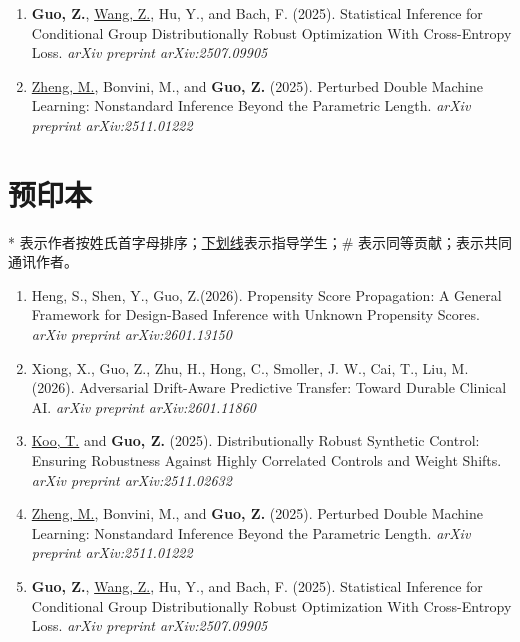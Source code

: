 \documentclass[margin, line]{res}
\begin{document}
\begin{resume}
\begin{enumerate}
			\item[(R8)] {\bf Guo, Z.}, \underline{Wang, Z.}, Hu, Y., and Bach, F. (2025).
				Statistical Inference for Conditional Group Distributionally Robust
				Optimization With Cross-Entropy Loss. {\it arXiv preprint arXiv:2507.09905}

			\item[(R9)] \underline{Zheng, M.}, Bonvini, M.\Envelope, and {\bf Guo, Z.}\Envelope
				(2025). Perturbed Double Machine Learning: Nonstandard Inference Beyond
				the Parametric Length. {\it arXiv preprint arXiv:2511.01222}
		\end{enumerate}

		\section{\sc 预印本}
		
		* 表示作者按姓氏首字母排序；\underline{下划线}表示指导学生；$\#$ 表示同等贡献；\Envelope 表示共同通讯作者。
		\vspace*{2mm}
		\begin{enumerate}
			\setlength{\itemsep}{3pt}

			\item Heng, S.\Envelope, Shen, Y., Guo, Z.\Envelope (2026). Propensity
				Score Propagation: A General Framework for Design-Based Inference with Unknown
				Propensity Scores. {\it arXiv preprint arXiv:2601.13150}

			\item Xiong, X., Guo, Z., Zhu, H., Hong, C., Smoller, J. W., Cai, T., Liu,
				M. (2026). Adversarial Drift-Aware Predictive Transfer: Toward Durable
				Clinical AI. {\it arXiv preprint arXiv:2601.11860}

			\item \underline{Koo, T.} and {\bf Guo, Z.} (2025). Distributionally Robust
				Synthetic Control: Ensuring Robustness Against Highly Correlated
				Controls and Weight Shifts. {\it arXiv preprint arXiv:2511.02632}

			\item \underline{Zheng, M.}, Bonvini, M.\Envelope, and {\bf Guo, Z.}\Envelope
				(2025). Perturbed Double Machine Learning: Nonstandard Inference Beyond
				the Parametric Length. {\it arXiv preprint arXiv:2511.01222}

			\item {\bf Guo, Z.}, \underline{Wang, Z.}, Hu, Y., and Bach, F. (2025).
				Statistical Inference for Conditional Group Distributionally Robust
				Optimization With Cross-Entropy Loss. {\it arXiv preprint arXiv:2507.09905}


\end{enumerate}
\end{resume}
\end{document}
